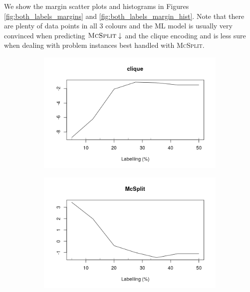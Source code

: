 \documentclass{l4proj}
\theoremstyle{definition}
\theoremstyle{remark}
\begin{document}
We show the margin scatter plots and histograms in Figures
\ref{fig:both_labels_margins} and \ref{fig:both_labels_margin_hist}. Note that
there are plenty of data points in all 3 colours and the ML model is usually
very convinced when predicting $\textsc{McSplit}\downarrow$ and the clique
encoding and is less sure when dealing with problem instances best handled with
\textsc{McSplit}.

\begin{figure}
  \centering
  \begin{subfigure}[t]{0.49\textwidth}
    \centering
    \includegraphics[width=\textwidth]{images/_both_labels_clique_labelling_.png}
  \end{subfigure}
  \begin{subfigure}[t]{0.49\textwidth}
    \centering
    \includegraphics[width=\textwidth]{images/_both_labels_mcsplit_labelling_.png}
  \end{subfigure}
  \begin{subfigure}[t]{0.49\textwidth}

\end{subfigure}
\end{figure}
\end{document}
